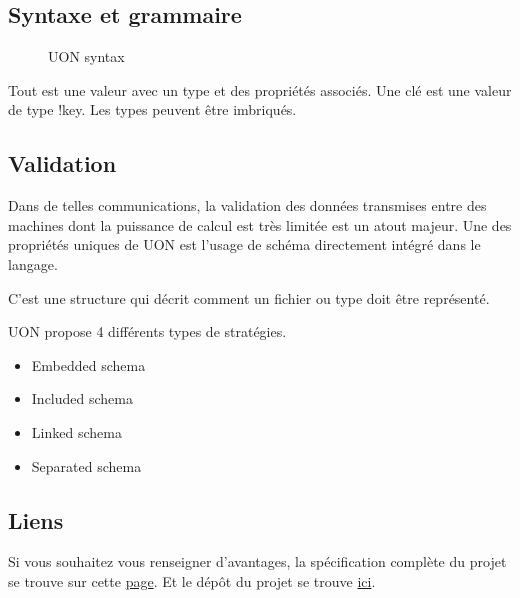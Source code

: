 \documentclass[
    iict, %
    il, %
]{heig-tb}
\begin{document}
\subsection{Syntaxe et grammaire}

\begin{figure}[!ht]
    \begin{center}
    \end{center}
    \caption[Règle de syntaxe en UON]{\label{syntax} UON syntax}
\end{figure}

Tout est une valeur avec un type et des propriétés associés. Une clé est une valeur de type !key. Les types peuvent être imbriqués.

\subsection{Validation}
Dans de telles communications, la validation des données transmises entre des machines dont la puissance de calcul est très limitée est un atout majeur.
Une des propriétés uniques de UON est l'usage de schéma directement intégré dans le langage.

C'est une structure qui décrit comment un fichier ou type doit être représenté.

UON propose 4 différents types de stratégies.

\begin{itemize}
    \item Embedded schema
    \item Included schema
    \item Linked schema
    \item Separated schema
\end{itemize}


\subsection{Liens}
Si vous souhaitez vous renseigner d'avantages, la spécification complète du projet se trouve sur cette \href{https://github.com/uon-language/specification/}{page}.
Et le dépôt du projet se trouve \href{https://github.com/uon-language/specification}{ici}.
\end{document}

